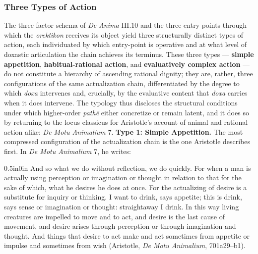 \documentclass{article}
\begin{document}

\subsubsection*{Three Types of Action} The three-factor schema of \textit{De Anima} III.10 and the three entry-points through which the \textit{orektikon} receives its object yield three structurally distinct types of action, each individuated by which entry-point is operative and at what level of doxastic articulation the chain achieves its terminus. These three types --- \textbf{simple appetition}, \textbf{habitual-rational action}, and \textbf{evaluatively complex action} --- do not constitute a hierarchy of ascending rational dignity; they are, rather, three configurations of the same actualization chain, differentiated by the degree to which \textit{doxa} intervenes and, crucially, by the evaluative content that \textit{doxa} carries when it does intervene. The typology thus discloses the structural conditions under which higher-order \textit{path\=e} either concretize or remain latent, and it does so by returning to the locus classicus for Aristotle's account of animal and rational action alike: \textit{De Motu Animalium} 7. \textbf{Type 1: Simple Appetition.} The most compressed configuration of the actualization chain is the one Aristotle describes first. In \textit{De Motu Animalium} 7, he writes: \begin{adjustwidth}{0.5in}{0in}
And so what we do without reflection, we do quickly. For when a man is actually using perception or imagination or thought in relation to that for the sake of which, what he desires he does at once. For the actualizing of desire is a substitute for inquiry or thinking. I want to drink, says appetite; this is drink, says sense or imagination or thought: straightaway I drink. In this way living creatures are impelled to move and to act, and desire is the last cause of movement, and desire arises through perception or through imagination and thought. And things that desire to act make and act sometimes from appetite or impulse and sometimes from wish (Aristotle, \textit{De Motu Animalium}, 701a29--b1).

\end{adjustwidth}
\end{document}
